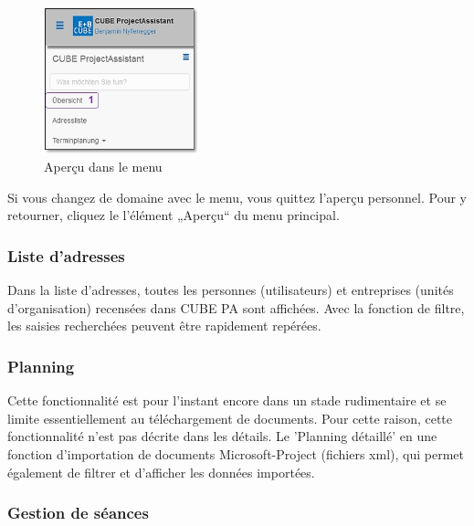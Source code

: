 \vspace{\baselineskip}

\begin{figure}
  \vspace{-45pt}
  \begin{center}
    \includegraphics[width=0.4\textwidth]{../chapters/01_Einfuehrung/pictures/1-3-2_MenuepunktUebersicht.jpg}
  \end{center}
  \vspace{-20pt}
  \caption{Aperçu dans le menu}
  \vspace{-10pt}
\end{figure}
Si vous changez de domaine avec le menu, vous quittez l'aperçu personnel. Pour y retourner, cliquez le l'élément „Aperçu“  du menu principal.

\pagebreak
\subsubsection{Liste d'adresses} %

Dans la liste d'adresses, toutes les personnes (utilisateurs) et entreprises (unités d'organisation) recensées dans CUBE PA sont affichées. Avec la fonction de filtre, les saisies recherchées peuvent être rapidement repérées.

\subsubsection{Planning} %

Cette fonctionnalité est pour l'instant encore dans un stade rudimentaire et se limite essentiellement au téléchargement de documents. Pour cette raison, cette fonctionnalité n'est pas décrite dans les détails. Le 'Planning détaillé' en une fonction d'importation de documents Microsoft-Project (fichiers xml), qui permet également de filtrer et d'afficher les données importées.

\subsubsection{Gestion de séances} %

